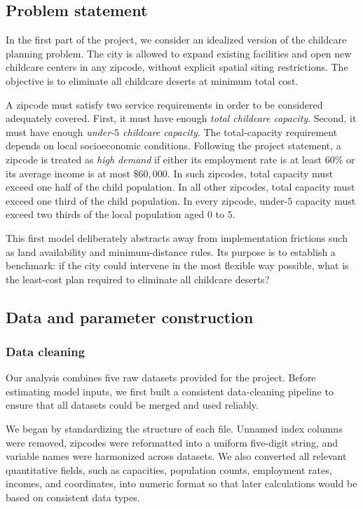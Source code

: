\documentclass[11pt]{article}
\newcommand{\1}{\mathbb{I}}
\begin{document}
\subsection{Problem statement}

In the first part of the project, we consider an idealized version of the childcare planning problem. The city is allowed to expand existing facilities and open new childcare centers in any zipcode, without explicit spatial siting restrictions. The objective is to eliminate all childcare deserts at minimum total cost.

A zipcode must satisfy two service requirements in order to be considered adequately covered. First, it must have enough \emph{total childcare capacity}. Second, it must have enough \emph{under-\(5\) childcare capacity}. The total-capacity requirement depends on local socioeconomic conditions. Following the project statement, a zipcode is treated as \emph{high demand} if either its employment rate is at least \(60\%\) or its average income is at most \(\$60{,}000\). In such zipcodes, total capacity must exceed one half of the child population. In all other zipcodes, total capacity must exceed one third of the child population. In every zipcode, under-\(5\) capacity must exceed two thirds of the local population aged \(0\) to \(5\).

This first model deliberately abstracts away from implementation frictions such as land availability and minimum-distance rules. Its purpose is to establish a benchmark: if the city could intervene in the most flexible way possible, what is the least-cost plan required to eliminate all childcare deserts?

\subsection{Data and parameter construction}

\subsubsection{Data cleaning}

Our analysis combines five raw datasets provided for the project. Before estimating model inputs, we first built a consistent data-cleaning pipeline to ensure that all datasets could be merged and used reliably.

We began by standardizing the structure of each file. Unnamed index columns were removed, zipcodes were reformatted into a uniform five-digit string, and variable names were harmonized across datasets. We also converted all relevant quantitative fields, such as capacities, population counts, employment rates, incomes, and coordinates, into numeric format so that later calculations would be based on consistent data types.
\end{document}
